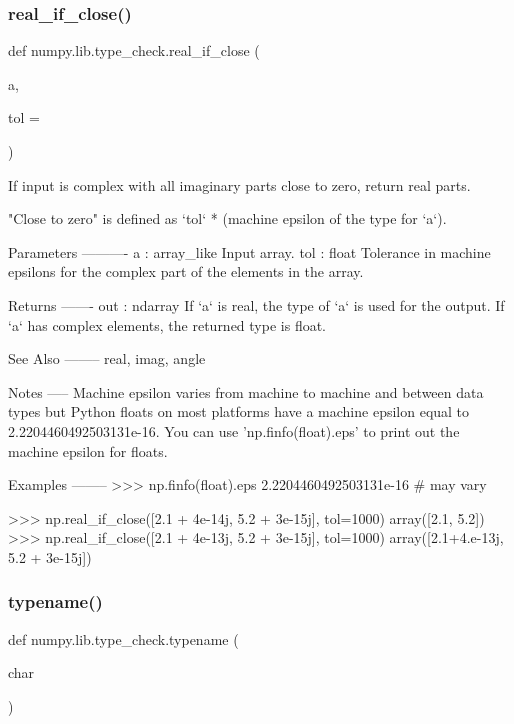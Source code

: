 \subsubsection{\texorpdfstring{real\+\_\+if\+\_\+close()}{real\_if\_close()}}
{\footnotesize\ttfamily def numpy.\+lib.\+type\+\_\+check.\+real\+\_\+if\+\_\+close (\begin{DoxyParamCaption}\item[{}]{a,  }\item[{}]{tol = {} }\end{DoxyParamCaption})}

\begin{DoxyVerb}If input is complex with all imaginary parts close to zero, return 
real parts.

"Close to zero" is defined as `tol` * (machine epsilon of the type for
`a`).

Parameters
----------
a : array_like
    Input array.
tol : float
    Tolerance in machine epsilons for the complex part of the elements
    in the array.

Returns
-------
out : ndarray
    If `a` is real, the type of `a` is used for the output.  If `a`
    has complex elements, the returned type is float.

See Also
--------
real, imag, angle

Notes
-----
Machine epsilon varies from machine to machine and between data types
but Python floats on most platforms have a machine epsilon equal to
2.2204460492503131e-16.  You can use 'np.finfo(float).eps' to print
out the machine epsilon for floats.

Examples
--------
>>> np.finfo(float).eps
2.2204460492503131e-16 # may vary

>>> np.real_if_close([2.1 + 4e-14j, 5.2 + 3e-15j], tol=1000)
array([2.1, 5.2])
>>> np.real_if_close([2.1 + 4e-13j, 5.2 + 3e-15j], tol=1000)
array([2.1+4.e-13j, 5.2 + 3e-15j])\end{DoxyVerb}
 \mbox{\label{namespacenumpy_1_1lib_1_1type__check_a27c3eb8ea21dc56f429d37473745d444}} 
\subsubsection{\texorpdfstring{typename()}{typename()}}
{\footnotesize\ttfamily def numpy.\+lib.\+type\+\_\+check.\+typename (\begin{DoxyParamCaption}\item[{}]{char }\end{DoxyParamCaption})}


